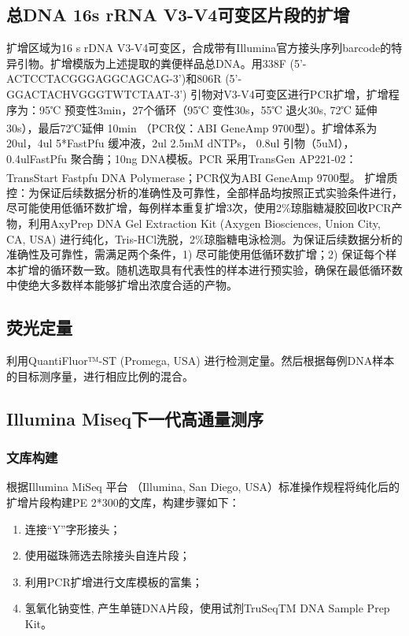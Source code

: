   \subsection{总DNA 16s rRNA V3-V4可变区片段的扩增}
  \label{总DNA 16s rRNA V3-V4可变区片段的扩增}
  扩增区域为16 s rDNA V3-V4可变区，合成带有Illumina官方接头序列barcode的特异引物。扩增模版为上述提取的粪便样品总DNA。用338F (5’-ACTCCTACGGGAGGCAGCAG-3’)和806R (5’-GGACTACHVGGGTWTCTAAT-3’) 引物对V3-V4可变区进行PCR扩增，扩增程序为：95℃ 预变性3min，27个循环（95℃ 变性30s，55℃ 退火30s, 72℃ 延伸30s），最后72℃延伸 10min （PCR仪：ABI GeneAmp\textsuperscript{\textregistered} 9700型）。扩增体系为20ul，4ul 5*FastPfu 缓冲液，2ul 2.5mM dNTPs， 0.8ul 引物（5uM）， 0.4ulFastPfu 聚合酶；10ng DNA模板。PCR 采用TransGen AP221-02：TransStart Fastpfu DNA Polymerase；PCR仪为ABI GeneAmp\textsuperscript{\textregistered} 9700型。
  扩增质控：为保证后续数据分析的准确性及可靠性，全部样品均按照正式实验条件进行，尽可能使用低循环数扩增，每例样本重复扩增3次，使用2\%琼脂糖凝胶回收PCR产物，利用AxyPrep DNA Gel Extraction Kit (Axygen Biosciences, Union City, CA, USA) 进行纯化，Tris-HCl洗脱，2\%琼脂糖电泳检测。为保证后续数据分析的准确性及可靠性，需满足两个条件，1) 尽可能使用低循环数扩增；2) 保证每个样本扩增的循环数一致。随机选取具有代表性的样本进行预实验，确保在最低循环数中使绝大多数样本能够扩增出浓度合适的产物。
  \subsection{荧光定量}
  \label{荧光定量}
  利用QuantiFluor™-ST (Promega, USA) 进行检测定量。然后根据每例DNA样本的目标测序量，进行相应比例的混合。
  \subsection{Illumina Miseq下一代高通量测序}
  \label{Illumina Miseq下一代高通量测序}
      \subsubsection{文库构建}
      根据Illumina MiSeq 平台 （Illumina, San Diego, USA）标准操作规程将纯化后的扩增片段构建PE 2*300的文库，构建步骤如下：
        \begin{enumerate}
          \item 连接“Y”字形接头；
          \item 使用磁珠筛选去除接头自连片段；
          \item 利用PCR扩增进行文库模板的富集；
          \item 氢氧化钠变性, 产生单链DNA片段，使用试剂TruSeqTM DNA Sample Prep Kit。
        \end{enumerate}
